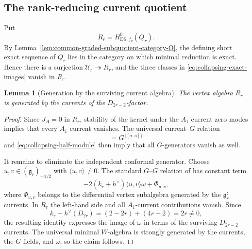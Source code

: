 \documentclass[11pt,reqno]{amsart}
\newtheorem{lemma}[theorem]{Lemma}
\theoremstyle{definition}
\theoremstyle{remark}
\begin{document}
\subsection{The rank-reducing current quotient}


Put
\begin{equation*}
  R_r=H^0_{\mathrm{DS},f_\theta}(Q_r).
\end{equation*}
By Lemma~\ref{lem:common-graded-subquotient-category-O}, the defining
short exact sequence of $Q_r$ lies in the category on which minimal
reduction is exact.  Hence there is a surjection
$\mathcal U_r\twoheadrightarrow R_r$, and the three classes in
\eqref{eq:collapsing-exact-images} vanish in $R_r$.

\begin{lemma}[Generation by the surviving current algebra]
\label{lem:collapsing-surviving-generation}
The vertex algebra $R_r$ is generated by the currents of the
$D_{2r-2}$-factor.
\end{lemma}

\begin{proof}
Since $J_A=0$ in $R_r$, stability of the kernel under the $A_1$ current
zero modes implies that every $A_1$ current vanishes.  The universal
current--$G$ relation
\begin{equation*}
  [J^{\{a\}}{}_{\lambda}G^{\{u\}}]
  =G^{\{[a,u]\}}
\end{equation*}
and \eqref{eq:collapsing-half-module} then imply that all $G$-generators
vanish as well.

It remains to eliminate the independent conformal generator.  Choose
$u,v\in(\mathfrak g_r)_{-1/2}$ with
$\langle u,v\rangle\ne0$.  The standard $G$--$G$ relation of
\cite[Lemma~3.1]{AdamovicKacMosenederFrajriaPapiPerse2018} has constant term
\begin{equation*}
  -2(k_r+h^\vee)\langle u,v\rangle\omega
  +\Phi_{u,v},
\end{equation*}
where $\Phi_{u,v}$ belongs to the differential vertex subalgebra generated
by the $\mathfrak g_r^\natural$ currents.  In $R_r$ the left-hand side and
all $A_1$-current contributions vanish.  Since
\begin{equation*}
  k_r+h^\vee(D_{2r})
  =(2-2r)+(4r-2)=2r\ne0,
\end{equation*}
the resulting identity expresses the image of $\omega$ in terms of the
surviving $D_{2r-2}$ currents.  The universal minimal $W$-algebra is
strongly generated by the currents, the $G$-fields, and $\omega$, so the
claim follows.
\end{proof}
\end{document}
